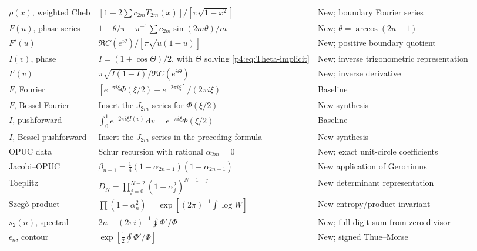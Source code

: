 \documentclass[11pt,oneside]{article}
\theoremstyle{definition}
\newcommand{\dd}{\,\mathrm d}
\begin{document}
\begin{longtable}{p{}p{}p{}}
\(\rho(x)\), weighted Cheb &
\([1+2\sum c_{2m}T_{2m}(x)]/[\pi\sqrt{1-x^2}]\) &
New; boundary Fourier series\\

\(F(u)\), phase series &
\(1-\theta/\pi-\pi^{-1}\sum c_{2m}\sin(2m\theta)/m\) &
New; \(\theta=\arccos(2u-1)\)\\

\(F'(u)\) &
\(\Re C(e^{i\theta})/[\pi\sqrt{u(1-u)}]\) &
New; positive boundary quotient\\

\(I(v)\), phase &
\(I=(1+\cos\Theta)/2\), with \(\Theta\) solving \eqref{p4:eq:Theta-implicit} &
New; inverse trigonometric representation\\

\(I'(v)\) &
\(\pi\sqrt{I(1-I)}/\Re C(e^{i\Theta})\) &
New; inverse derivative\\

\(F\), Fourier &
\([e^{-\pi i\xi}\Phi(\xi/2)-e^{-2\pi i\xi}]/(2\pi i\xi)\) &
Baseline\\

\(F\), Bessel Fourier &
Insert the \(J_{2m}\)-series for \(\Phi(\xi/2)\) &
New synthesis\\

\(I\), pushforward &
\(\int_0^1e^{-2\pi i\xi I(v)}\dd v=e^{-\pi i\xi}\Phi(\xi/2)\) &
Baseline\\

\(I\), Bessel pushforward &
Insert the \(J_{2m}\)-series in the preceding formula &
New synthesis\\

OPUC data &
Schur recursion with rational \(\alpha_{2m}=0\) &
New; exact unit-circle coefficients\\

Jacobi--OPUC &
\(\beta_{n+1}=\tfrac14(1-\alpha_{2n-1})(1+\alpha_{2n+1})\) &
New application of Geronimus\\

Toeplitz &
\(D_N=\prod_{j=0}^{N-2}(1-\alpha_j^2)^{N-1-j}\) &
New determinant representation\\

Szeg\H{o} product &
\(\prod(1-\alpha_n^2)=\exp[(2\pi)^{-1}\int\log W]\) &
New entropy/product invariant\\

\(s_2(n)\), spectral &
\(2n-(2\pi i)^{-1}\oint\Phi'/\Phi\) &
New; full digit sum from zero divisor\\

\(\epsilon_n\), contour &
\(\exp[\tfrac12\oint\Phi'/\Phi]\) &
New; signed Thue--Morse\\


\end{longtable}
\end{document}
